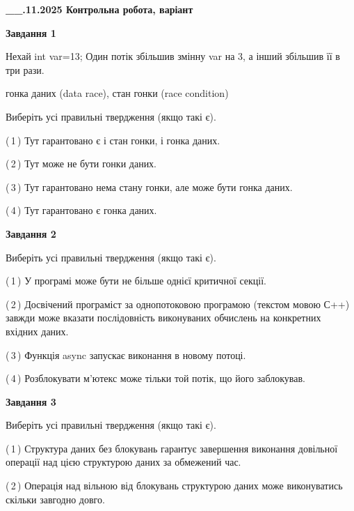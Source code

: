 \documentclass[12pt, ukrainian]{article}
\begin{document}
\begin {large}

\textbf{\_\_.11.2025 Контрольна робота, варіант  }\par


{

\begin{center}
\textbf{Завдання 1}
\end{center}
Нехай int var=13; Один потік збільшив змінну var на 3, а інший збільшив її в три рази.

гонка даних (data race), стан гонки (race condition)

Виберіть усі правильні твердження (якщо такі є).\par
\vspace{2mm}
(\,1\,) Тут гарантовано є і стан гонки, і гонка даних.%

(\,2\,) Тут може не бути гонки даних.%

(\,3\,) Тут гарантовано нема стану гонки, але може бути гонка даних.%

(\,4\,) Тут гарантовано є гонка даних.%



\begin{center}
\textbf{Завдання 2}
\end{center}
Виберіть усі правильні твердження (якщо такі є).\par
\vspace{2mm}

(\,1\,) У програмі може бути не більше однієї критичної секції.%

(\,2\,) Досвічений програміст за однопотоковою програмою (текстом мовою С++) завжди може вказати послідовність виконуваних обчислень на конкретних вхідних даних.%

(\,3\,) Функція async запускає виконання в новому потоці.%

(\,4\,) Розблокувати м’ютекс може тільки той потік, що його заблокував.%



\begin{center}
\textbf{Завдання 3}
\end{center}
Виберіть усі правильні твердження (якщо такі є).\par
\vspace{2mm}

(\,1\,) Структура даних без блокувань гарантує завершення виконання довільної операції над цією структурою даних за обмежений час.%

(\,2\,) Операція над вільною від блокувань структурою даних може виконуватись скільки завгодно довго.%

}
\end{large}
\end{document}
